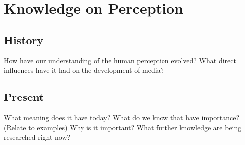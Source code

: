 \chapter{Knowledge on Perception}
\section{History}
How have our understanding of the human perception evolved?
What direct influences have it had on the development of media?

\section{Present}
What meaning does it have today?
What do we know that have importance? (Relate to examples)
Why is it important?
What further knowledge are being researched right now?
